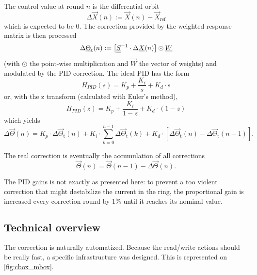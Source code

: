 The control value at round $n$ is the differential orbit 
\begin{equation}
 \Delta \vec{X}(n) := \vec{X}(n)-\vec{X}_\text{ref}
\end{equation}
which is expected to be 0. The correction provided by the weighted response matrix is then processed
\begin{equation}
\Delta \underline{\Theta}_\text{t}(n) :=  \left[ \underline{\underline{S}}^{-1} \cdot \Delta \underline{X}(n) \right] \odot \underline{W}
\end{equation}
(with $\odot$ the point-wise multiplication and $\vec{W}$ the vector of weights) and modulated by the PID correction. The ideal PID has the form
\begin{equation}
H_{PID}(s) = K_p + \frac{K_i}{s} + K_d \cdot s 
\end{equation}
or, with the z transform (calculated with Euler's method),
\begin{equation}
H_{PID}(z) = K_p + \frac{K_i}{1-z} + K_d \cdot (1-z)
\end{equation}
which yields
\begin{equation}
\Delta \vec{\Theta}(n) =  K_p \cdot \Delta \vec{\Theta}_\text{t}(n) + K_i \cdot \sum\limits_{k=0}^{n-1}\Delta \vec{\Theta}_\text{t}(k) + K_d \cdot \left[\Delta \vec{\Theta}_\text{t}(n) - \Delta \vec{\Theta}_\text{t}(n-1)\right].
\end{equation}

The real correction is eventually the accumulation of all corrections
\begin{equation}
\vec{\Theta}(n) = \vec{\Theta}(n-1) - \Delta \vec{\Theta}(n).
\end{equation}

\remark The PID gains is not exactly as presented here: to prevent a too violent correction that might destabilize the current in the ring, the proportional gain is increased every correction round by 1\% until it reaches its nominal value.

\subsection{Technical overview}

The correction is naturally automatized. Because the read/write actions should be really fast, a specific infrastructure was designed. This is represented on \cref{fig:cbox_mbox}. 

